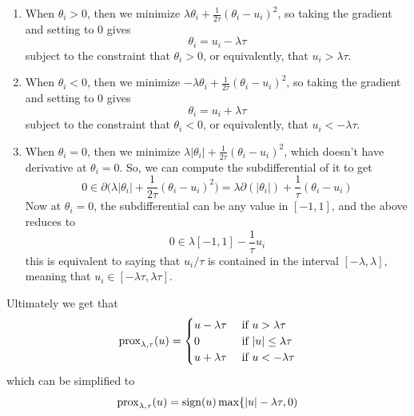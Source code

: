    \begin{enumerate}
      \item When $\theta_i > 0$, then we minimize $\lambda \theta_i + \frac{1}{2\tau} (\theta_i - u_i)^2$, so taking the gradient and setting to $0$ gives 
      \begin{equation}
        \theta_i = u_i - \lambda \tau
      \end{equation}
      subject to the constraint that $\theta_i > 0$, or equivalently, that $u_i > \lambda \tau$. 

      \item When $\theta_i < 0$, then we minimize $-\lambda \theta_i + \frac{1}{2\tau} ( \theta_i - u_i)^2$, so taking the gradient and setting to $0$ gives 
      \begin{equation}
        \theta_i = u_i + \lambda \tau
      \end{equation}
      subject to the constraint that $\theta_i < 0$, or equivalently, that $u_i < -\lambda \tau$. 

      \item When $\theta_i = 0$, then we minimize $\lambda |\theta_i| + \frac{1}{2\tau} (\theta_i - u_i)^2$, which doesn't have derivative at $\theta_i = 0$. So, we can compute the subdifferential of it to get 
      \[0 \in \partial \bigg( \lambda |\theta_i| + \frac{1}{2\tau} (\theta_i - u_i)^2 \bigg) = \lambda \partial (|\theta_i|) + \frac{1}{\tau} (\theta_i - u_i)\]
      Now at $\theta_i = 0$, the subdifferential can be any value in $[-1, 1]$, and the above reduces to 
      \begin{equation}
        0 \in \lambda [-1, 1] - \frac{1}{\tau} u_i
      \end{equation}
      this is equivalent to saying that $u_i/\tau$ is contained in the interval $[-\lambda, \lambda]$, meaning that $u_i \in [-\lambda \tau, \lambda \tau]$. 
    \end{enumerate}

    Ultimately we get that 
    \begin{equation}
      \prox_{\lambda, \tau} (u) = \begin{cases} u - \lambda \tau & \text{ if } u > \lambda \tau \\ 0 & \text{ if } |u| \leq \lambda \tau \\ u + \lambda \tau & \text{ if } u < - \lambda \tau \end{cases}
    \end{equation}
    which can be simplified to 
    \begin{equation}
      \prox_{\lambda, \tau} (u) = \mathrm{sign}(u) \max\{ |u| - \lambda \tau, 0)
    \end{equation}

